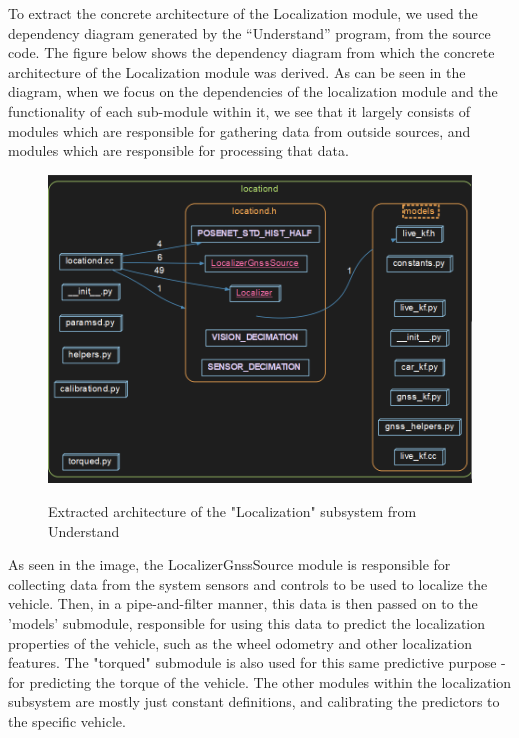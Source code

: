 \documentclass[12pt]{article}
\begin{document}
To extract the concrete architecture of the Localization module, we used the dependency diagram generated by the “Understand” program, from the source code. The figure below shows the dependency diagram from which the concrete architecture of the Localization module was derived. As can be seen in the diagram, when we focus on the dependencies of the localization module and the functionality of each sub-module within it, we see that it largely consists of modules which are responsible for gathering data from outside sources, and modules which are responsible for processing that data. 


\begin{figure}[H]
    \centering
    \includegraphics[scale=0.4]{extracted-architecture-understand.png}\\
    \caption{Extracted architecture of the "Localization" subsystem from Understand}
    \label{fig:enter-label}
\end{figure}

As seen in the image, the LocalizerGnssSource module is responsible for collecting data from the system sensors and controls to be used to localize the vehicle. Then, in a pipe-and-filter manner, this data is then passed on to the 'models' submodule, responsible for using this data to predict the localization properties of the vehicle, such as the wheel odometry and other localization features. The "torqued" submodule is also used for this same predictive purpose - for predicting the torque of the vehicle. The other modules within the localization subsystem are mostly just constant definitions, and calibrating the predictors to the specific vehicle.
\end{document}

